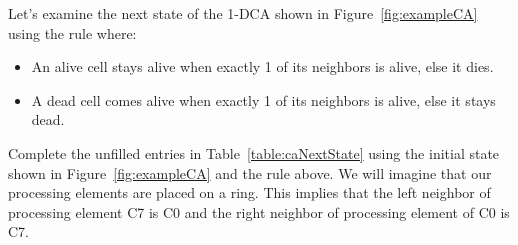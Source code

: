 Let's examine the next state of the 1-DCA shown in Figure~\ref{fig:exampleCA} 
using the rule where:

\begin{itemize}
\item
  An alive cell stays alive when exactly 1 of its neighbors is alive,
  else it dies.
\item
  A dead cell comes alive when exactly 1 of its neighbors is alive, else
  it stays dead.
\end{itemize}

Complete the unfilled entries in Table~\ref{table:caNextState} using the initial state shown
in Figure~\ref{fig:exampleCA} and the rule above. We will imagine that our processing
elements are placed on a ring. This implies that the left neighbor of
processing element C7 is C0 and the right neighbor of processing element
of C0 is C7.

